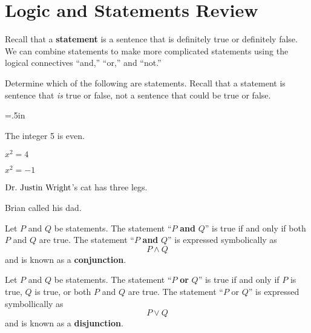 \chapter{Logic and Statements Review}

Recall that a \textbf{statement} is a sentence that is definitely true or definitely false.  We can combine statements to make more complicated statements using the logical connectives ``and,'' ``or,'' and ``not.''\\

\begin{center}
\end{center}

\begin{question}  
\item Determine which of the following are statements.  Recall that a statement is sentence that \textit{is} true or false, not a sentence that could be true or false.
	\begin{qpart} \itemsep=.5in
	\item The integer 5 is even.
	\item $x^2=4$
	\item $x^2=-1$
	\item $\text{Dr.~Justin Wright}$'s cat has three legs.
	\item Brian called his dad. 
	\vspace{.5in}
	\end{qpart}
\end{question}

\begin{definition}  Let $P$ and $Q$ be statements.  The statement ``$P$ \textbf{and} $Q$'' is true if and only if both $P$ and $Q$ are true.  The statement ``$P$ \textbf{and} $Q$'' is expressed symbolically as
\[ P \wedge  Q \]
and is known as a \textbf{conjunction}.
\end{definition}

\begin{definition}  Let $P$ and $Q$ be statements.  The statement ``$P$ \textbf{or} $Q$'' is true if and only if $P$ is true, $Q$ is true, or both $P$ and $Q$ are true.  The statement ``$P$ or $Q$'' is expressed symbollically as 
\[ P \vee Q \] 
and is known as a \textbf{disjunction}.
\end{definition}

